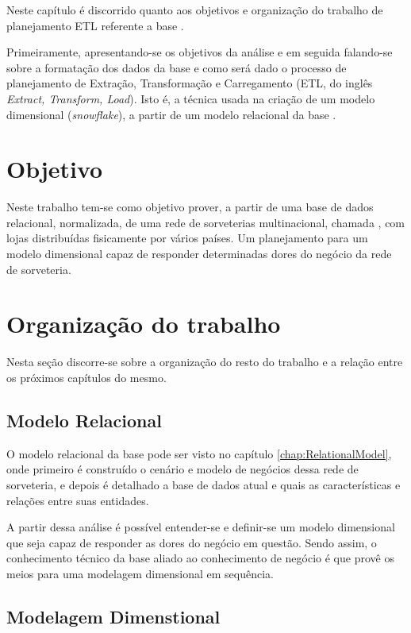 \label{chap:Introduction} Neste capítulo é discorrido quanto aos objetivos e organização do trabalho de planejamento ETL referente a base \emph{\databaseName}. 

Primeiramente, apresentando-se os objetivos da análise e em seguida falando-se sobre a formatação dos dados da base e como será dado o processo de planejamento de Extração, Transformação e Carregamento (ETL, do inglês \emph{Extract, Transform, Load}). Isto é, a técnica usada na criação de um modelo dimensional (\emph{snowflake}), a partir de um modelo relacional da base \emph{\databaseName}. 

\section{Objetivo}

Neste trabalho tem-se como objetivo prover, a partir de uma base de dados relacional, normalizada,
de uma rede de sorveterias multinacional, chamada \emph{\storeFullName{}}, com lojas distribuídas fisicamente por vários países. Um planejamento para um modelo dimensional capaz de responder determinadas dores do negócio da
rede de sorveteria.

\section {Organização do trabalho}

Nesta seção discorre-se sobre a organização do resto do trabalho e a relação entre os próximos capítulos do mesmo.

\subsection{Modelo Relacional}

O modelo relacional da base \emph{\databaseName{}} pode ser visto no capítulo \ref{chap:RelationalModel}, onde primeiro é construído o cenário e modelo de negócios dessa rede de sorveteria, e depois é detalhado a base de dados atual e quais as características e relações entre suas entidades.

A partir dessa análise é possível entender-se e definir-se um modelo dimensional que seja capaz de responder as dores do negócio em questão. Sendo assim, o conhecimento técnico da base aliado ao conhecimento de negócio é que provê os meios para uma modelagem dimensional em sequência.

\subsection{Modelagem Dimenstional}

